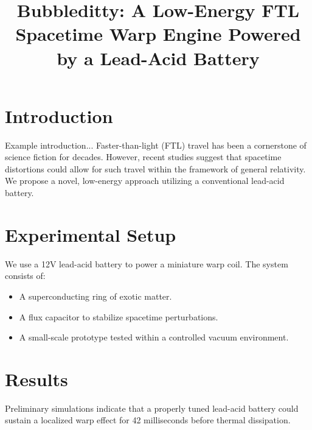 \documentclass[conference]{IEEEtran} %
\begin{document}
\title{Bubbleditty: A Low-Energy FTL Spacetime Warp Engine Powered by a Lead-Acid Battery}

\author{
    \and
}
\maketitle

\begin{abstract}
    \lipsum[1] %
\end{abstract}

\section{Introduction}
Example introduction...  Faster-than-light (FTL) travel has been a cornerstone of science fiction for decades. However, recent studies\cite{Pu2013_WiSee} suggest that spacetime distortions could allow for such travel within the framework of general relativity. We propose a novel, low-energy approach utilizing a conventional lead-acid battery.

\section{Experimental Setup}
We use a 12V lead-acid battery to power a miniature warp coil. The system consists of:
\begin{itemize}
    \item A superconducting ring of exotic matter.
    \item A flux capacitor to stabilize spacetime perturbations.
    \item A small-scale prototype tested within a controlled vacuum environment.
\end{itemize}

\section{Results}
Preliminary simulations indicate that a properly tuned lead-acid battery could sustain a localized warp effect for 42 milliseconds before thermal dissipation.
\end{document}
